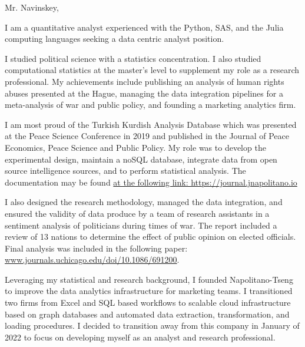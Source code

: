 \documentclass{ExpressiveCoverLetter}
\begin{document}
\coverletterheader[
    firstname=Justin,
    middleinitial=B,
    lastname=Napolitano, 
    email=justin@jnapolitano.io, 
    phone=832-299-0372,            
    city=Houston,
    state=Texas
]


Mr. Navinskey,

\begin{flushleft}
\begin{normalsize} 

    \singlespacing 

    I am a quantitative analyst experienced with the Python, SAS, and the Julia computing languages seeking a data centric analyst position.
    
    I studied political science with a statistics concentration.  I also studied computational statistics at the master's level to supplement my role as a research professional.  My achievements include publishing an analysis of human rights abuses presented at the Hague, managing the data integration pipelines for a meta-analysis of war and public policy, and founding a marketing analytics firm.  

    I am most proud of the Turkish Kurdish Analysis Database which was presented at the Peace Science Conference in 2019 and published in the Journal of Peace Economics, Peace Science and Public Policy.  My role was to develop the experimental design, maintain a noSQL database, integrate data from open source intelligence sources, and to perform statistical analysis.  The documentation may be found \href{https://journal.jnapolitano.io/parts/articles/project-kurdish-conflict/index.html}{at the following link: https://journal.jnapolitano.io}

    I also designed the research methodology, managed the data integration, and ensured the validity of data produce by a team of research assistants in a sentiment analysis of politicians during times of war.  The report included a review of 13 nations to determine the effect of public opinion on elected officials.  Final analysis was included in the following paper: \href{https://www.journals.uchicago.edu/doi/10.1086/691200}{www.journals.uchicago.edu/doi/10.1086/691200}.   

    Leveraging my statistical and research background, I founded Napolitano-Tseng to improve the data analytics infrastructure for marketing teams.  I transitioned two firms from Excel and SQL based workflows to scalable cloud infrastructure based on graph databases and automated data extraction, transformation, and loading procedures.  I decided to transition away from this company in January of 2022 to focus on developing myself as an analyst and research professional.  
    

\end{normalsize}
\end{flushleft}
\end{document}
